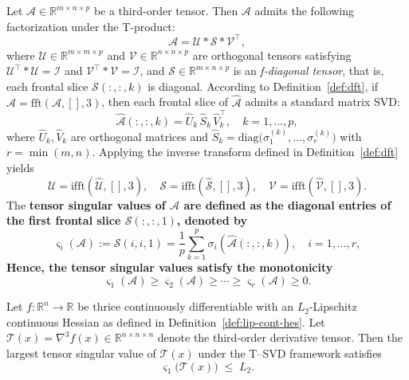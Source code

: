 \documentclass[10pt,a4paper]{amsart}
\begin{document}
\begin{theorem}
\label{thm:tsvd}
Let $\mathcal{A}\in\mathbb{R}^{m\times n\times p}$ be a third-order tensor. 
Then $\mathcal{A}$ admits the following factorization under the T-product:
\[
\mathcal{A} = \mathcal{U} * \mathcal{S} * \mathcal{V}^\top,
\]
where $\mathcal{U}\in\mathbb{R}^{m\times m\times p}$ and 
$\mathcal{V}\in\mathbb{R}^{n\times n\times p}$ are orthogonal tensors satisfying 
$\mathcal{U}^\top * \mathcal{U} = \mathcal{I}$ and $\mathcal{V}^\top * \mathcal{V} = \mathcal{I}$, 
and $\mathcal{S}\in\mathbb{R}^{m\times n\times p}$ is an \emph{f-diagonal tensor}, 
that is, each frontal slice $\mathcal{S}(:,:,k)$ is diagonal.
According to Definition~\ref{def:dft}, if 
$\widehat{\mathcal{A}}=\mathrm{fft}(\mathcal{A},[],3)$, 
then each frontal slice of $\widehat{\mathcal{A}}$ admits a standard matrix SVD:
\[
\widehat{\mathcal{A}}(:,:,k)
= \widehat{U}_k\,\widehat{S}_k\,\widehat{V}_k^\top, 
\quad k=1,\dots,p,
\]
where $\widehat{U}_k,\widehat{V}_k$ are orthogonal matrices and 
$\widehat{S}_k=\mathrm{diag}\big(\sigma_1^{(k)},\dots,\sigma_{r}^{(k)}\big)$ with $r=\min(m,n)$. Applying the inverse transform defined in Definition~\ref{def:dft} yields
\[
\mathcal{U}=\mathrm{ifft}(\widehat{\mathcal{U}},[],3), \quad
\mathcal{S}=\mathrm{ifft}(\widehat{\mathcal{S}},[],3), \quad
\mathcal{V}=\mathrm{ifft}(\widehat{\mathcal{V}},[],3).
\]
The \bf{tensor singular values} of $\mathcal{A}$ are defined as the diagonal entries of the first frontal slice $\mathcal{S}(:,:,1)$, denoted by
\[
\varsigma_i(\mathcal{A}) := \mathcal{S}(i,i,1)
= \frac{1}{p}\sum_{k=1}^{p}\sigma_i(\widehat{\mathcal{A}}(:,:,k)), 
\quad i=1,\dots,r,
\]
Hence, the tensor singular values satisfy the monotonicity
\[
\varsigma_1(\mathcal{A}) \ge \varsigma_2(\mathcal{A}) \ge \cdots 
\ge \varsigma_r(\mathcal{A}) \ge 0.
\]
\end{theorem}

\begin{theorem}
\label{thm:tensor-b3}
Let $f:\mathbb{R}^n\to\mathbb{R}$ be thrice continuously differentiable with an
$L_2$-Lipschitz continuous Hessian as defined in
Definition~\ref{def:lip-cont-hes}. Let $\mathcal{T}(x)=\nabla^3 f(x)\in\mathbb{R}^{n\times n\times n}$ denote the third-order derivative tensor.
Then the largest tensor singular value of $\mathcal{T}(x)$ under the T--SVD framework satisfies
\[
\varsigma_1\!\big(\mathcal{T}(x)\big) \;\le\; L_2.
\]
\end{theorem}
\end{document}
